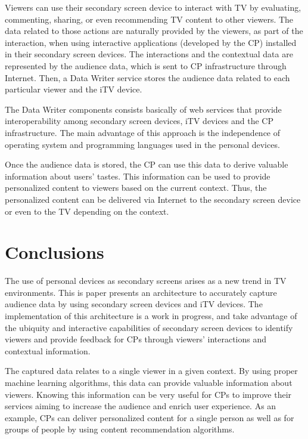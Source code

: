 \documentclass[conference,a4paper]{IEEEtran}
\newcommand{\blurb}[1]{\marginpar{{\tt !!!}}{\tt [... #1 ...]}}
\begin{document}
Viewers can use their secondary screen device to interact with TV by evaluating, commenting, sharing, or even recommending TV content to other viewers. The data related to those actions are naturally provided by the viewers, as part of the interaction, when using interactive applications (developed by the CP) installed in their secondary screen devices. The interactions and the contextual data are represented by the audience data, which is sent to CP infrastructure through Internet. Then, a Data Writer service stores the audience data related to each particular viewer and the iTV device.

The Data Writer components consists basically of web services that provide interoperability among secondary screen devices, iTV devices and the CP infrastructure. The main advantage of this approach is the independence of operating system and programming languages used in the personal devices.

Once the audience data is stored, the CP can use this data to derive valuable information about users' tastes. This information can be used to provide personalized content to viewers based on the current context. Thus, the personalized content can be delivered via Internet to the secondary screen device or even to the TV depending on the context.


\section{Conclusions}

The use of personal devices as secondary screens arises as a new trend in TV environments. This is paper presents an architecture to accurately capture audience data by using secondary screen devices and iTV devices. The implementation of this architecture is a work in progress, and take advantage of the ubiquity and interactive capabilities of secondary screen devices to identify viewers and provide feedback for CPs through viewers' interactions and contextual information. 

The captured data relates to a single viewer in a given context. By using proper machine learning algorithms, this data can provide valuable information about viewers. Knowing this information can be very useful for CPs to improve their services aiming to increase the audience and enrich user experience. As an example, CPs can deliver personalized content for a single person as well as for groups of people by using content recommendation algorithms.
\end{document}
